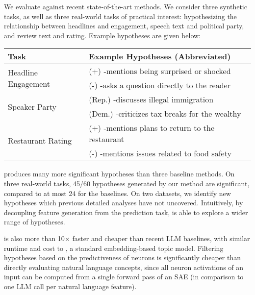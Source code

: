 We evaluate \ourmethod against recent state-of-the-art methods. We consider three synthetic tasks, as well as three real-world tasks of practical interest: hypothesizing the relationship between headlines and engagement, speech text and political party, and review text and rating. Example \ourmethod hypotheses are given below:

\begin{center}
\small
\begin{tabular}{p{1.7cm}p{5.7cm}}
\toprule
Task & Example Hypotheses (Abbreviated) \\ \midrule
\multirow{2}{2cm}{Headline Engagement}          & (+) \hyp{mentions being surprised or shocked} \\
 & (-) \hyp{asks a question directly to the reader} \\ 
\midrule
\multirow{2}{2cm}{Speaker Party}          & (Rep.) \hyp{discusses illegal immigration} \\
 & (Dem.) \hyp{criticizes tax breaks for the wealthy} \\ 
\midrule
\multirow{2}{2cm}{Restaurant Rating}          & (+) \hyp{mentions plans to return to the restaurant} \\
 & (-) \hyp{mentions issues related to food safety} \\ 
\bottomrule
\end{tabular}
\end{center}

\ourmethod produces many more significant hypotheses than three baseline methods. On three real-world tasks, 45/60 hypotheses generated by our method are significant, compared to at most 24 for the baselines. On two datasets, we identify new hypotheses which previous detailed analyses have not uncovered. Intuitively, by decoupling feature generation from the prediction task, \ourmethod is able to explore a wider range of hypotheses.

\ourmethod is also more than 10$\times$ faster and cheaper than recent LLM baselines, with similar runtime and cost to \bertopic, a standard embedding-based topic model. Filtering hypotheses based on the predictiveness of neurons is significantly cheaper than directly evaluating natural language concepts, since all neuron activations of an input can be computed from a single forward pass of an SAE (in comparison to one LLM call per natural language feature).
